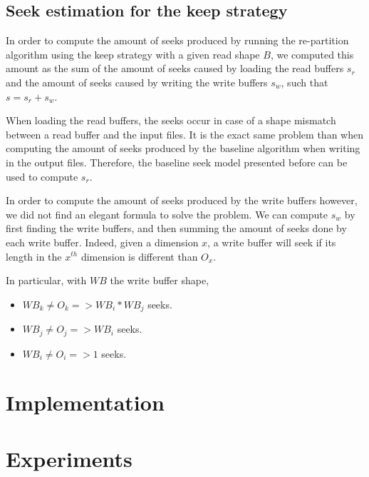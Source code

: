 \documentclass[conference]{IEEEtran}
\begin{document}
\subsection{Seek estimation for the keep strategy}

In order to compute the amount of seeks produced by running the re-partition
algorithm using the keep strategy with a given read shape $B$, we computed this
amount as the sum of the amount of seeks caused by loading the read buffers $s_r$
and the amount of seeks caused by writing the write buffers $s_w$,
such that $s=s_r+s_w$.

When loading the read buffers, the seeks occur in case of a shape mismatch
between a read buffer and the input files. It is the exact same problem than
when computing the amount of seeks produced by the baseline algorithm when
writing in the output files. Therefore, the baseline seek model presented
before can be used to compute $s_r$.

In order to compute the amount of seeks produced by the write buffers however,
we did not find an elegant formula to solve the problem. We can compute $s_w$
by first finding the write buffers, and then summing the amount of seeks done
by each write buffer. Indeed, given a dimension $x$, a write buffer will seek
if its length in the $x^{th}$ dimension is different than $O_x$.

In particular, with $WB$ the write buffer shape,
\begin{itemize}
  \item $WB_k \neq O_k => WB_i*WB_j$ seeks.
  \item $WB_j \neq O_j => WB_i$ seeks.
  \item $WB_i \neq O_i => 1$ seeks.
\end{itemize}

\section{Implementation}



\section{Experiments}
\end{document}
